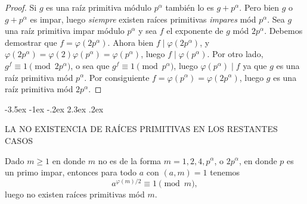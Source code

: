 \documentclass[12pt,a4paper]{book}
\makeatletter
\renewcommand\section{\@startsection{section}{1}{\z@}%
  {-3.5ex \@plus -1ex \@minus -.2ex}%
  {2.3ex \@plus .2ex}%
  {\normalfont\Large\bfseries\raggedright}}
\makeatother
\begin{document}
    \begin{proof}
        Si $g$ es una raíz primitiva módulo $p^{\alpha}$ también lo es $g+p^{\alpha}$. Pero
        bien $g$ o $g+p^{\alpha}$ es impar, luego \textit{siempre} existen raíces
        primitivas \textit{impares} mód $p^{\alpha}$. Sea $g$ una raíz primitiva impar módulo
        $p^{\alpha}$ y sea $f$ el exponente de $g$ mód $2p^{\alpha}$. Debemos demostrar que
        $f=\varphi(2p^{\alpha})$. Ahora bien $f\mid\varphi(2p^{\alpha})$, y
        $\varphi(2p^{\alpha})=\varphi(2)\varphi(p^{\alpha})=\varphi(p^{\alpha})$, luego
        $f\mid\varphi(p^{\alpha})$. Por otro lado, $g^{f}\equiv1\pmod{2p^{\alpha}}$, o sea que
        $g^{f}\equiv1\pmod{p^{\alpha}}$, luego $\varphi(p^{\alpha})\mid f$ ya que $g$ es una
        raíz primitiva mód $p^{\alpha}$. Por consiguiente
        $f=\varphi(p^{\alpha})=\varphi(2p^{\alpha})$, luego $g$ es una raíz primitiva mód
        $2p^{\alpha}$.
    \end{proof}

    \section{LA NO EXISTENCIA DE RAÍCES PRIMITIVAS EN LOS RESTANTES CASOS}

    \begin{teorema}\label{teo:10-8}
        Dado $m\geq1$ en donde $m$ no es de la forma $m=1,2,4,p^{\alpha}$, o $2p^{\alpha}$,
        en donde $p$ es un primo impar, entonces para todo $a$ con $(a,m)=1$ tenemos
        \begin{equation*}
            a^{\varphi(m)/2}\equiv1\pmod{m},
        \end{equation*}
        luego no existen raíces primitivas mód $m$.
    \end{teorema}
\end{document}
